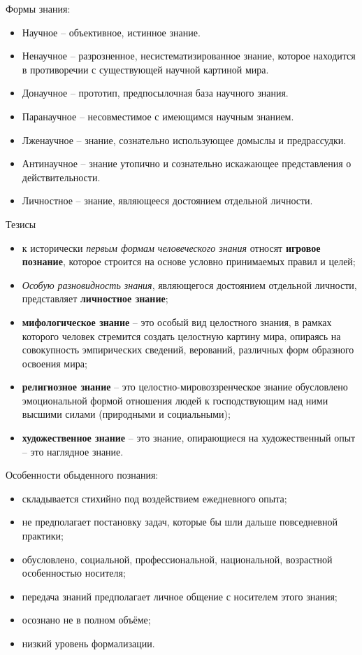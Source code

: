 
Формы знания:
\begin{itemize}
    \item Научное -- объективное, истинное знание.
    \item Ненаучное -- разрозненное, несистематизированное знание, которое находится в противоречии с 
        существующей научной картиной мира.
    \item Донаучное -- прототип, предпосылочная база научного знания.
    \item Паранаучное -- несовместимое с имеющимся научным знанием.
    \item Лженаучное -- знание, сознательно использующее домыслы и предрассудки.
    \item Антинаучное -- знание утопично и сознательно искажающее представления о действительности.
    \item Личностное -- знание, являющееся достоянием отдельной личности.
\end{itemize}

Тезисы
\begin{itemize}
    \item к исторически \emph{первым формам человеческого знания} относят \textbf{игровое познание}, которое 
        строится на основе условно принимаемых правил и целей;
    \item \emph{Особую разновидность знания}, являющегося достоянием отдельной личности, представляет 
        \textbf{личностное знание};
    \item \textbf{мифологическое знание} -- это особый вид целостного знания, в рамках которого человек 
        стремится создать целостную картину мира, опираясь на совокупность эмпирических сведений, верований, 
        различных форм образного освоения мира;
    \item \textbf{религиозное знание} -- это целостно-мировоззренческое знание обусловлено эмоциональной 
        формой отношения людей к господствующим над ними высшими силами (природными и социальными);
    \item \textbf{художественное знание} -- это знание, опирающиеся на художественный опыт -- это наглядное 
        знание.
\end{itemize}

Особенности обыденного познания:
\begin{itemize}
    \item складывается стихийно под воздействием ежедневного опыта;
    \item не предполагает постановку задач, которые бы шли дальше повседневной практики;
    \item обусловлено, социальной, профессиональной, национальной, возрастной особенностью носителя;
    \item передача знаний предполагает личное общение с носителем этого знания;
    \item осознано не в полном объёме;
    \item низкий уровень формализации.
\end{itemize}

